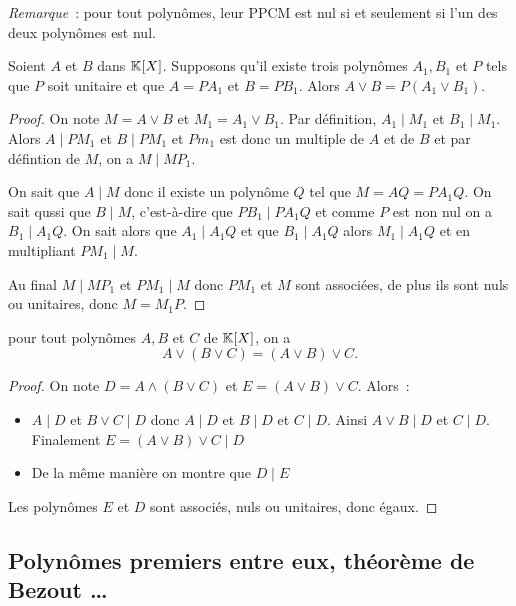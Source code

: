 \emph{Remarque}~: pour tout polynômes, leur PPCM est nul si et seulement si l'un des deux polynômes est nul.

\begin{prop}
  Soient \(A\) et \(B\) dans \(\mathbb{K}[X]\). Supposons qu'il existe trois polynômes \(A_1,B_1\) et \(P\) tels que \(P\) soit unitaire et que \(A=PA_1\) et \(B=PB_1\). Alors \(A\vee B = P(A_1 \vee B_1)\).
\end{prop}
\begin{proof}
  On note \(M=A \vee B\) et \(M_1=A_1 \vee B_1\). Par définition, \(A_1\mid{}M_1\) et \(B_1\mid{}M_1\). Alors \(A\mid{}PM_1\) et \(B\mid{}PM_1\) et \(Pm_1\) est donc un multiple de \(A\) et de \(B\) et par défintion de \(M\), on a \(M\mid{}MP_1\).

  On sait que \(A\mid{}M\) donc il existe un polynôme \(Q\) tel que \(M=AQ=PA_1Q\). On sait qussi que \(B\mid{}M\), c'est-à-dire que \(PB_1\mid{}PA_1Q\) et comme \(P\) est non nul on a \(B_1\mid{}A_1Q\). On sait alors que \(A_1\mid{}A_1Q\) et que \(B_1\mid{}A_1Q\) alors \(M_1\mid{}A_1Q\) et en multipliant \(PM_1\mid{}M\).

  Au final \(M\mid{}MP_1\) et \(PM_1\mid{}M\) donc \(PM_1\) et \(M\) sont associées, de plus ils sont nuls ou unitaires, donc \(M=M_1P\).
\end{proof}

\begin{prop}[Associativité]
  pour tout polynômes \(A,B\) et \(C\) de \(\mathbb{K}[X]\), on a
  \begin{equation}
    A \vee (B\vee C) = (A\vee B) \vee C.
  \end{equation}
\end{prop}
\begin{proof}
  On note \(D=A \wedge (B\vee C)\) et \(E=(A\vee B) \vee C\). Alors~:
  \begin{itemize}
  \item \(A\mid{}D\) et \(B \vee C\mid{}D\) donc \(A\mid{}D\) et \(B\mid{}D\) et \(C\mid{} D\). Ainsi \(A \vee B\mid{}D\) et \(C\mid{}D\). Finalement \(E=(A\vee B) \vee C\mid{}D\)
  \item De la même manière on montre que \(D\mid{}E\)
  \end{itemize}
  Les polynômes \(E\) et \(D\) sont associés, nuls ou unitaires, donc égaux.
\end{proof}

\subsection{Polynômes premiers entre eux, théorème de Bezout \ldots}

